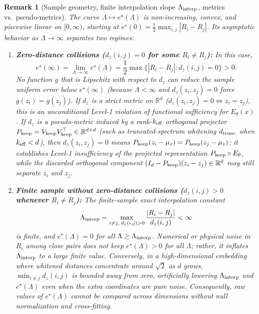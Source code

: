 \documentclass[preprint,11pt,a4paper]{elsarticle}
\newtheorem{remark}{Remark}
\newcommand{\R}{\mathbb{R}}
\begin{document}
\begin{remark}[Sample geometry, finite interpolation slope $\Lambda_{\rm interp}$, metrics vs.\ pseudo-metrics]
\label{rem:geometry}
The curve $\Lambda\mapsto e^\star(\Lambda)$ is non-increasing, convex, and piecewise linear on $[0,\infty)$, starting at $e^\star(0)=\frac12\max_{i,j}|R_i-R_j|$. Its asymptotic behavior as $\Lambda\to\infty$ separates two regimes:
\begin{enumerate}
    \item \textbf{Zero-distance collisions ($d_z(i,j)=0$ for some $R_i\ne R_j$):} In this case,
    \begin{equation}
    e^\star(\infty)=\lim_{\Lambda\to\infty}e^\star(\Lambda)
    = \frac12\max\big\{|R_i-R_j| : d_z(i,j)=0\big\} > 0.
    \end{equation}
    No function $g$ that is Lipschitz with respect to $d_z$ can reduce the sample uniform error below $e^\star(\infty)$ (because $\Lambda<\infty$ and $d_z(z_i,z_j)=0$ force $g(z_i)=g(z_j)$). If $d_z$ is a strict metric on $\R^d$ ($d_z(z_i,z_j)=0\iff z_i=z_j$), this is an unconditional Level-1 violation of functional sufficiency for $E_\theta(x)$. If $d_z$ is a pseudo-metric induced by a rank-$k_{\rm eff}$ orthogonal projector $P_{\rm keep}=V_{\rm keep}V_{\rm keep}^\top\in\R^{d\times d}$ (such as truncated-spectrum whitening $d_{\rm trunc}$ when $k_{\rm eff}<d$), then $d_z(z_i,z_j)=0$ means $P_{\rm keep}(z_i-\mu_z)=P_{\rm keep}(z_j-\mu_z)$: it establishes Level-1 insufficiency of the \emph{projected} representation $P_{\rm keep}\circ E_\theta$, while the discarded orthogonal component $(I_d-P_{\rm keep})(z_i-z_j)\in\R^d$ may still separate $z_i$ and $z_j$.
    \item \textbf{Finite sample without zero-distance collisions ($d_z(i,j)>0$ whenever $R_i\ne R_j$):} The finite-sample exact interpolation constant
    \begin{equation}
    \Lambda_{\rm interp}
    = \max_{i\ne j,\;d_z(i,j)>0}\frac{|R_i-R_j|}{d_z(i,j)} < \infty
    \label{eq:lambda_interp}
    \end{equation}
    is finite, and $e^\star(\Lambda)=0$ for all $\Lambda\ge\Lambda_{\rm interp}$. Numerical or physical noise in $R_i$ among close pairs does \emph{not} keep $e^\star(\Lambda)>0$ for all $\Lambda$; rather, it inflates $\Lambda_{\rm interp}$ to a large finite value. Conversely, in a high-dimensional embedding where whitened distances concentrate around $\sqrt{2}$ as $d$ grows, $\min_{i\ne j}d_z(i,j)$ is bounded away from zero, artificially lowering $\Lambda_{\rm interp}$ and $e^\star(\Lambda)$ even when the extra coordinates are pure noise. Consequently, raw values of $e^\star(\Lambda)$ cannot be compared across dimensions without null normalization and cross-fitting.
\end{enumerate}
\end{remark}
\end{document}

